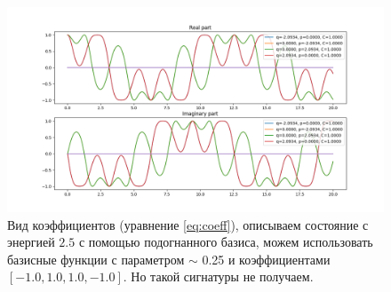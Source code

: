 \begin{figure}[H]
\includegraphics[scale=0.5]{eq_coeff.png}
\caption{Вид коэффициентов (уравнение \ref{eq:coeff}), описываем состояние с энергией $2.5$ с помощью подогнанного базиса, %
	 можем использовать базисные функции с параметром $\sim$ 0.25 и коэффициентами $[-1.0, 1.0, 1.0, -1.0]$. %
	 Но такой сигнатуры не получаем. }
\end{figure}
